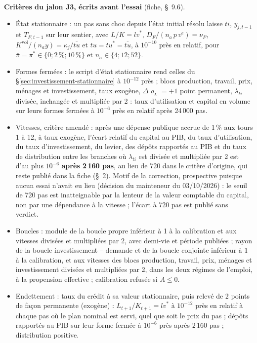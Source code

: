 \documentclass[11pt,a4paper]{article}
\begin{document}
\begin{proposee}
\textbf{Critères du jalon J3, écrits avant l'essai} (fiche, \S~9.6).
\begin{itemize}
\item État stationnaire : un pas sans choc depuis l'état initial résolu laisse $\mathit{ti}$, $y_{j,t-1}$ et $T_{F,t-1}$ sur leur sentier, avec $L/K = \mathit{lv}^\ast$, $D_F/(n_a\,p\,v^e) = \nu_F$, $K^{\mathrm{vol}}/(n_a y) = \kappa_j/\overline{\mathit{tu}}$ et $\mathit{tu} = \mathit{tu}^\ast = \overline{\mathit{tu}}$, à $10^{-10}$ près en relatif, pour $\bar\pi = \pi^\ast \in \{0 ; 2\,\% ; 10\,\%\}$ et $n_a \in \{4 ; 12 ; 52\}$.
\item Formes fermées : le script d'état stationnaire rend celles du \S\ref{sec:investissement-stationnaire} à $10^{-12}$ près ; blocs production, travail, prix, ménages et investissement, taux exogène, $\Delta\varrho_L = +1$ point permanent, $\lambda_{\mathit{ti}}$ divisée, inchangée et multipliée par 2 : taux d'utilisation et capital en volume sur leurs formes fermées à $10^{-6}$ près en relatif après 24\,000 pas.
\item Vitesses, critère amendé : après une dépense publique accrue de 1\,\% aux tours 1 à 12, à taux exogène, l'écart relatif du capital au PIB, du taux d'utilisation, du taux d'investissement, du levier, des dépôts rapportés au PIB et du taux de distribution entre les branches où $\lambda_{\mathit{ti}}$ est divisée et multipliée par 2 est d'au plus $10^{-6}$ \textbf{après 2\,160 pas}, au lieu de 720 dans le critère d'origine, qui reste publié dans la fiche (\S~2). Motif de la correction, prospective puisque aucun essai n'avait eu lieu (décision du mainteneur du 03/10/2026) : le seuil de 720 pas est inatteignable par la lenteur de la valeur comptable du capital, non par une dépendance à la vitesse ; l'écart à 720 pas est publié sans verdict.
\item Boucles : module de la boucle propre inférieur à 1 à la calibration et aux vitesses divisées et multipliées par 2, avec demi-vie et période publiées ; rayon de la boucle investissement -- demande et de la boucle conjointe inférieur à 1 à la calibration, et aux vitesses des blocs production, travail, prix, ménages et investissement divisées et multipliées par 2, dans les deux régimes de l'emploi, à la propension effective ; calibration refusée si $A \le 0$.
\item Endettement : taux du crédit à sa valeur stationnaire, puis relevé de 2 points de façon permanente (exogène) : $L_{t+1}/K_{t+1} = \mathit{lv}^\ast$ à $10^{-12}$ près en relatif à chaque pas où le plan nominal est servi, quel que soit le prix du pas ; dépôts rapportés au PIB sur leur forme fermée à $10^{-6}$ près après 2\,160 pas ; distribution positive.

\end{itemize}
\end{proposee}
\end{document}
